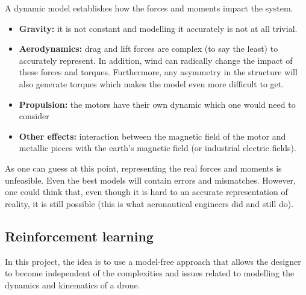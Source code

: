 A dynamic model establishes how the forces and moments impact the system.  


\begin{itemize}
    \centering 
    \item \textbf{Gravity:} it is not constant and modelling it accurately is not at all trivial.
    \item \textbf{Aerodynamics:} drag and lift forces are complex (to say the least) to accurately represent. In addition, wind can radically change the impact of these forces and torques. 
    Furthermore, any asymmetry in the structure will also generate torques which makes 
    the model even more difficult to get.
    \item \textbf{Propulsion:} the motors have their own dynamic which one would need to consider
    \item \textbf{Other effects:} interaction between the magnetic field of the motor and metallic 
    pieces with the earth's magnetic field (or industrial electric fields).  
\end{itemize}    

As one can guess at this point, representing the real forces and moments is unfeasible. Even 
the best models will contain errors and mismatches. However, one could think that, even though 
it is hard to an accurate representation of reality, it is still possible (this is what aeronautical
engineers did and still do).

\subsection{Reinforcement learning}

In this project, the idea is to use a model-free approach that allows the designer 
to become independent of the complexities and issues related to modelling the dynamics 
and kinematics of a drone.

